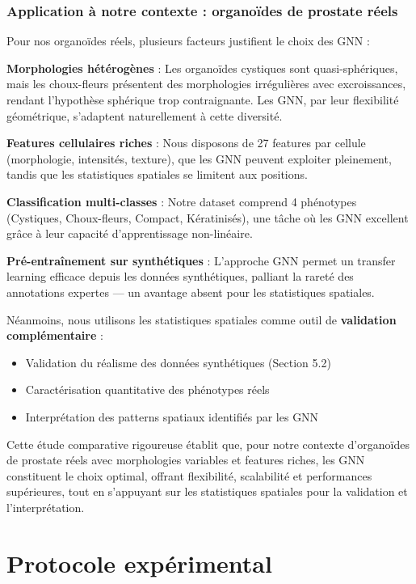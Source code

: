 \subsubsection{Application à notre contexte : organoïdes de prostate réels}

Pour nos organoïdes réels, plusieurs facteurs justifient le choix des GNN :

\textbf{Morphologies hétérogènes} : Les organoïdes cystiques sont quasi-sphériques, mais les choux-fleurs présentent des morphologies irrégulières avec excroissances, rendant l'hypothèse sphérique trop contraignante. Les GNN, par leur flexibilité géométrique, s'adaptent naturellement à cette diversité.

\textbf{Features cellulaires riches} : Nous disposons de 27 features par cellule (morphologie, intensités, texture), que les GNN peuvent exploiter pleinement, tandis que les statistiques spatiales se limitent aux positions.

\textbf{Classification multi-classes} : Notre dataset comprend 4 phénotypes (Cystiques, Choux-fleurs, Compact, Kératinisés), une tâche où les GNN excellent grâce à leur capacité d'apprentissage non-linéaire.

\textbf{Pré-entraînement sur synthétiques} : L'approche GNN permet un transfer learning efficace depuis les données synthétiques, palliant la rareté des annotations expertes — un avantage absent pour les statistiques spatiales.

Néanmoins, nous utilisons les statistiques spatiales comme outil de \textbf{validation complémentaire} :
\begin{itemize}
    \item Validation du réalisme des données synthétiques (Section 5.2)
    \item Caractérisation quantitative des phénotypes réels
    \item Interprétation des patterns spatiaux identifiés par les GNN
\end{itemize}

Cette étude comparative rigoureuse établit que, pour notre contexte d'organoïdes de prostate réels avec morphologies variables et features riches, les GNN constituent le choix optimal, offrant flexibilité, scalabilité et performances supérieures, tout en s'appuyant sur les statistiques spatiales pour la validation et l'interprétation.

\section{Protocole expérimental}

